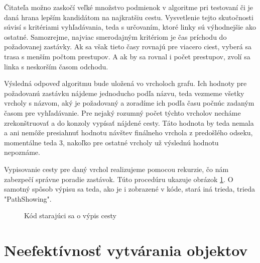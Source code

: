 Čitateľa možno zaskočí veľké množstvo podmienok v algoritme pri testovaní či je daná hrana lepším kandidátom na najkratšiu cestu. Vysvetlenie tejto skutočnosti súvisí s kritériami vyhľadávania, teda s určovaním, ktoré linky sú výhodnejšie ako ostatné. Samozrejme, najviac smerodajným kritériom je čas príchodu do požadovanej zastávky. Ak sa však tieto časy rovnajú pre viacero ciest, vyberá sa trasa s menším počtom prestupov. A ak by sa rovnal i počet prestupov, zvolí sa linka s neskorším časom odchodu.\newline

Výsledná odpoveď algoritmu bude uložená vo vrcholoch grafu. Ich hodnoty pre požadovanú zastávku nájdeme jednoducho podľa názvu, teda vezmeme všetky vrcholy s názvom, aký je požadovaný a zoradíme ich podľa času počnúc zadaným časom pre vyhľadávanie. Pre nejaký rozumný počet týchto vrcholov necháme zrekonštruovať a do konzoly vypísať nájdené cesty. Táto hodnota by teda nemala a ani nemôže presiahnuť hodnotu návštev finálneho vrchola z predošlého odseku, momentálne teda $3$, nakoľko pre ostatné vrcholy už výslednú hodnotu nepoznáme.\newline

Vypisovanie cesty pre daný vrchol realizujeme pomocou rekurzie, čo nám zabezpečí správne poradie zastávok. Túto procedúru ukazuje obrázok \ref{PathShowing}. O samotný spôsob výpisu sa teda, ako je i zobrazené v kóde, stará iná trieda, trieda "PathShowing".\newline

\begin{figure}[H]
  \caption{Kód starajúci sa o výpis cesty}
  \label{PathShowing}
\end{figure}


\section{Neefektívnosť vytvárania objektov}

